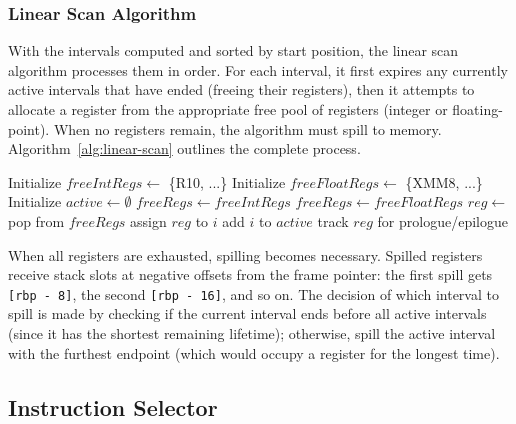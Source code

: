 \documentclass[11pt]{article}
\newcommand{\code}[1]{\texttt{#1}}
\renewcommand{\algref}[1]{Algorithm~\ref{#1}}
\begin{document}
\subsubsection{Linear Scan Algorithm}

With the intervals computed and sorted by start position, the linear scan algorithm processes them in order. For each interval, it first expires any currently active intervals that have ended (freeing their registers), then it attempts to allocate a register from the appropriate free pool of registers (integer or floating-point). When no registers remain, the algorithm must spill to memory. \algref{alg:linear-scan} outlines the complete process.

\begin{algorithm}[h]
	\begin{algorithmic}[1]
		\State Initialize $freeIntRegs \gets$ \{R10, ...\}
		\State Initialize $freeFloatRegs \gets$ \{XMM8, ...\}
		\State Initialize $active \gets \emptyset$
		\State {}
		\State $freeRegs \gets freeIntRegs$
		\Else
		\State $freeRegs \gets freeFloatRegs$
		\EndIf
		\State $reg \gets$ pop from $freeRegs$
		\State assign $reg$ to $i$
		\State add $i$ to $active$
		\State track $reg$ for prologue/epilogue
		\EndIf
		\Else
		\State {}
		\EndIf
		\EndFor
		\EndProcedure
	\end{algorithmic}
	\caption{Linear Scan Register Allocation}
	\label{alg:linear-scan}
\end{algorithm}

When all registers are exhausted, spilling becomes necessary. Spilled registers receive stack slots at negative offsets from the frame pointer: the first spill gets \code{[rbp - 8]}, the second \code{[rbp - 16]}, and so on. The decision of which interval to spill is made by checking if the current interval ends before all active intervals (since it has the shortest remaining lifetime); otherwise, spill the active interval with the furthest endpoint (which would occupy a register for the longest time).

\newpage

\subsection{Instruction Selector}
\end{document}
